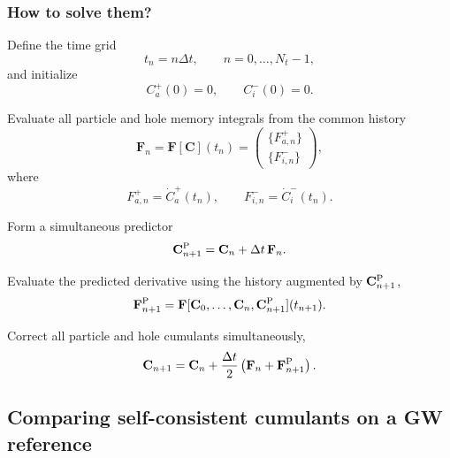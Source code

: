 \subsubsection{How to solve them? }
\begin{algorithm}[H]
\caption{Coupled propagation of particle and hole cumulants}
\begin{algorithmic}[1]

\State Define the time grid
\[
t_n=n\Delta t,
\qquad
n=0,\ldots,N_t-1,
\]
and initialize
\[
C_a^+(0)=0,
\qquad
C_i^-(0)=0.
\]


    \State Evaluate all particle and hole memory integrals from the common history
    \[
    \mathbf F_n
    =
    \mathbf F[\mathbf C](t_n)
    =
    \begin{pmatrix}
        \{F_{a,n}^+\}\\
        \{F_{i,n}^-\}
    \end{pmatrix},
    \]
    where
    \[
    F_{a,n}^+
    =
    \dot C_a^+(t_n),
    \qquad
    F_{i,n}^-
    =
    \dot C_i^-(t_n).
    \]

    \State Form a simultaneous predictor
    \[
    \mathbf C_{n+1}^{\rm P}
    =
    \mathbf C_n
    +
    \Delta t\,\mathbf F_n.
    \]

    \State Evaluate the predicted derivative using the history augmented by
    $\mathbf C_{n+1}^{\rm P}$,
    \[
    \mathbf F_{n+1}^{\rm P}
    =
    \mathbf F[
        \mathbf C_0,\ldots,\mathbf C_n,
        \mathbf C_{n+1}^{\rm P}
    ](t_{n+1}).
    \]

    \State Correct all particle and hole cumulants simultaneously,
    \[
    \mathbf C_{n+1}
    =
    \mathbf C_n
    +
    \frac{\Delta t}{2}
    \left(
        \mathbf F_n
        +
        \mathbf F_{n+1}^{\rm P}
    \right).
    \]

\EndFor

\end{algorithmic}
\end{algorithm}
\subsection{Comparing self-consistent cumulants on a GW reference}
